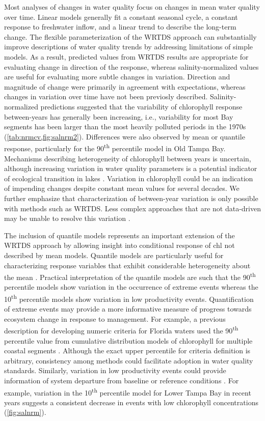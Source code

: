 \documentclass[letterpaper,12pt,oneside]{article}\usepackage[]{graphicx}\usepackage[]{color}
\newcommand{\nine}{90\textsuperscript{th} percentile }
\newcommand{\ten}{10\textsuperscript{th} percentile }
\begin{document}
Most analyses of changes in water quality focus on changes in mean water quality over time.  Linear models generally fit a constant seasonal cycle, a constant response to freshwater inflow, and a linear trend to describe the long-term change.  The flexible parameterization of the \ac{WRTDS} approach can substantially improve descriptions of water quality trends by addressing limitations of simple models.  As a result, predicted values from \ac{WRTDS} results are appropriate for evaluating change in direction of the response, whereas salinity-normalized values are useful for evaluating more subtle changes in variation.  Direction and magnitude of change were primarily in agreement with expectations, whereas changes in variation over time have not been previosly described.  Salinity-normalized predictions suggested that the variability of chlorophyll response between-years has generally been increasing, i.e., variability for most Bay segments has been larger than the most heavily polluted periods in the 1970s (\cref{tab:nrmcv,fig:salnrm2}).  Differences were also observed by mean or quantile response, particularly for the \nine model in Old Tampa Bay.  Mechanisms describing heterogeneity of chlorophyll between years is uncertain, although increasing variation in water quality parameters is a potential indicator of ecological transition in lakes \citep{Carpenter06}.   Variation in chlorophyll could be an indication of impending changes despite constant mean values for several decades.  We further emphasize that characterization of between-year variation is only possible with methods such as \ac{WRTDS}.  Less complex approaches that are not data-driven may be unable to resolve this variation \citep[e.g., additive seasonal models, ][]{Cloern10}.     

The inclusion of quantile models represents an important extension of the \ac{WRTDS} approach by allowing insight into conditional response of \ac{chl} not described by mean models.  Quantile models are particularly useful for characterizing response variables that exhibit considerable heterogeneity about the mean \citep{Terrell96,Cade03}.  Practical interpretation of the quantile models are such that the \nine models show variation in the occurrence of extreme events whereas the \ten models show variation in low productivity events.  Quantification of extreme events may provide a more informative measure of progress towards ecosystem change in response to management.  For example, a previous description for developing numeric criteria for Florida waters used the \nine value from cumulative distribution models of chlorophyll for multiple coastal segments \citep{Schaeffer12}.  Although the exact upper percentile for criteria definition is arbitrary, consistency among methods could facilitate adoption in water quality standards.  Similarly, variation in low productivity events could provide information of system departure from baseline or reference conditions \citep[e.g., ][]{Stoddard06}. For example, variation in the \ten model for Lower Tampa Bay in recent years suggests a consistent decrease in events with low chlorophyll concentrations (\cref{fig:salnrm}).
\end{document}
